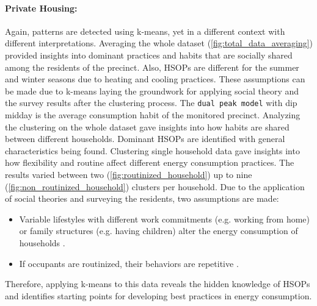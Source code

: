 \paragraph*{Private Housing:}
Again, patterns are detected using k-means, yet in a different context with different interpretations.
Averaging the whole dataset (\ref{fig:total_data_averaging}) provided insights into dominant practices and habits that are socially shared among the residents of the precinct.
Also, HSOPs are different for the summer and winter seasons due to heating and cooling practices.
These assumptions can be made due to k-means laying the groundwork for applying social theory and the survey results after the clustering process.
The \texttt{dual peak model} with dip midday is the average consumption habit of the monitored precinct.
Analyzing the clustering on the whole dataset gave insights into how habits are shared between different households.
Dominant HSOPs are identified with general characteristics being found.
Clustering single household data gave insights into how flexibility and routine affect different energy consumption practices.
The results varied between two (\ref{fig:routinized_household}) up to nine (\ref{fig:non_routinized_household}) clusters per household.
Due to the application of social theories and surveying the residents, two assumptions are made:
\begin{itemize}
    \item Variable lifestyles with different work commitments (e.g. working from home) or family structures (e.g. having children) alter the energy consumption of households \cite{KUR-HBP}.
    \item If occupants are routinized, their behaviors are repetitive \cite{BRE-EWP}.
\end{itemize}
Therefore, applying k-means to this data reveals the hidden knowledge of HSOPs and identifies starting points for developing best practices in energy consumption.
